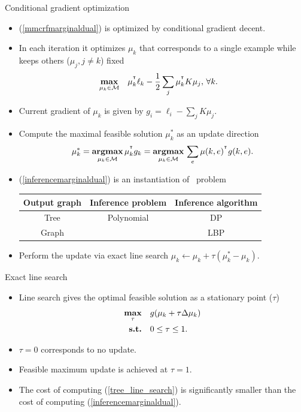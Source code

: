 \documentclass[first=dgreen,second=purple,logo=yellowexc]{aaltoslides}
\begin{document}
%
\begin{frame}{Conditional gradient optimization}
	\begin{itemize}\footnotesize
		\item (\ref{mmcrfmarginaldual}) is optimized by conditional gradient decent.
		\item In each iteration it optimizes $\mu_k$ that corresponds to a single example while keeps others ($\mu_j,j\neq k$) fixed 
		\begin{align*}
			\underset{\mathbf {\mu}_k\in\mathcal{M}}{\textbf{max}} & \quad \mathbf {\mu}_k^{^{\intercal}}\ell_k - \frac{1}{2}\sum_{j}\mathbf {\mu}_k^{^{\intercal}}K\mathbf {\mu}_j, \, \forall k.
		\end{align*}
		\item Current gradient of $\mu_k$ is given by $g_i = \ell_{i}-\sum_{j}K\mu_j$.
		\item Compute the maximal feasible solution $\mu_k^*$ as an update direction
		\begin{align}
			\mu_k^* = \underset{\mu_k\in\mathcal{M}}{\textbf{argmax}} \, \mu_k^{^{\intercal}}g_k = \underset{\mu_k\in\mathcal{M}}{\textbf{argmax}} \, \sum_e\mu(k,e)^{^{\intercal}}g(k,e). \label{inferencemarginaldual}
		\end{align}
		\item (\ref{inferencemarginaldual}) is an instantiation of \map\ problem 
		\begin{tabular}{|c|c|c|}
			\hline
			\footnotesize
			 Output graph & Inference problem & Inference algorithm \\ \hline
			 Tree & Polynomial & DP \cite{Rousu07}  \\
			 Graph & \nphard & LBP \cite{su10structured}  \\ \hline
		\end{tabular}
		\item Perform the update via exact line search $\mu_k \leftarrow \mu_k + \tau(\mu_k^*-\mu_k)$.
	\end{itemize}
\end{frame}

%
\begin{frame}{Exact line search}
	\begin{itemize}
		\item Line search gives the optimal feasible solution as a stationary point ($\tau$)
		\begin{align}
			\underset{\tau}{\textbf{max}} &\quad g(\mathbf {\mu}_k + \tau\Delta\mathbf {\mu}_{k})\label{tree_line_search}\\
			\textbf{s.t.} &\quad 0\le\tau\le1.\nonumber
		\end{align}
		\item $\tau=0$ corresponds to no update.
		\item Feasible maximum update is achieved at $\tau=1$. 
		\item The cost of computing (\ref{tree_line_search}) is significantly smaller than the cost of computing (\ref{inferencemarginaldual}).
	\end{itemize}
\end{frame}
\end{document}
